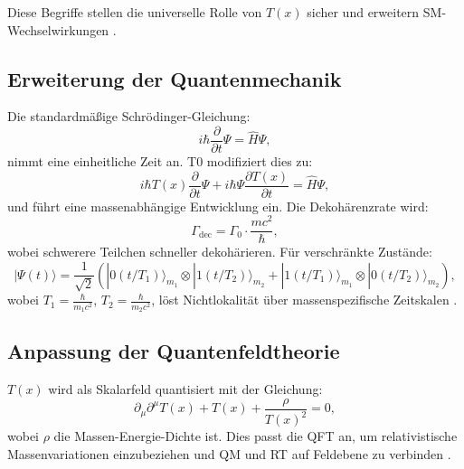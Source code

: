 \documentclass[12pt,a4paper]{article}
\newcommand{\Tfield}{T(x)}
\begin{document}
	Diese Begriffe stellen die universelle Rolle von \(\Tfield\) sicher und erweitern SM-Wechselwirkungen \cite{pascher_lagrange_2025}.
	
	\subsection{Erweiterung der Quantenmechanik}
	\label{subsec:qm_extension}
	
	Die standardmäßige Schrödinger-Gleichung:
	\begin{equation}
		i\hbar \frac{\partial}{\partial t} \Psi = \hat{H} \Psi,
		\label{eq:standard_schrodinger}
	\end{equation}
	nimmt eine einheitliche Zeit an. T0 modifiziert dies zu:
	\begin{equation}
		i\hbar \Tfield \frac{\partial}{\partial t} \Psi + i\hbar \Psi \frac{\partial \Tfield}{\partial t} = \hat{H} \Psi,
		\label{eq:modified_schrodinger}
	\end{equation}
	und führt eine massenabhängige Entwicklung ein. Die Dekohärenzrate wird:
	\begin{equation}
		\Gamma_{\text{dec}} = \Gamma_0 \cdot \frac{m c^2}{\hbar},
		\label{eq:decoherence}
	\end{equation}
	wobei schwerere Teilchen schneller dekohärieren. Für verschränkte Zustände:
	\begin{equation}
		|\Psi(t)\rangle = \frac{1}{\sqrt{2}}(|0(t/T_1)\rangle_{m_1} \otimes |1(t/T_2)\rangle_{m_2} + |1(t/T_1)\rangle_{m_1} \otimes |0(t/T_2)\rangle_{m_2}),
		\label{eq:entangled_state}
	\end{equation}
	wobei \(T_1 = \frac{\hbar}{m_1 c^2}\), \(T_2 = \frac{\hbar}{m_2 c^2}\), löst Nichtlokalität über massenspezifische Zeitskalen \cite{pascher_photons_2025}.
	
	\subsection{Anpassung der Quantenfeldtheorie}
	\label{subsec:qft_extension}
	
	\(\Tfield\) wird als Skalarfeld quantisiert mit der Gleichung:
	\begin{equation}
		\partial_{\mu}\partial^{\mu}\Tfield + \Tfield + \frac{\rho}{\Tfield^2} = 0,
		\label{eq:field_eq}
	\end{equation}
	wobei \(\rho\) die Massen-Energie-Dichte ist. Dies passt die QFT an, um relativistische Massenvariationen einzubeziehen und QM und RT auf Feldebene zu verbinden \cite{pascher_lagrange_2025}.
	
\end{document}
